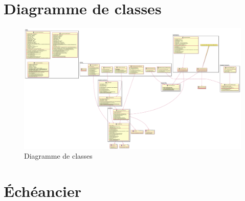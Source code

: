 \documentclass{article}
\begin{document}
\section{Diagramme de classes}
    \begin{figure}[ht!]
        \centering
        \caption{Diagramme de classes}
        \includegraphics[width=0.8\linewidth]{images/diagramme_classes.pdf}
    \end{figure}
\newpage
\section{Échéancier}
    
\end{document}
